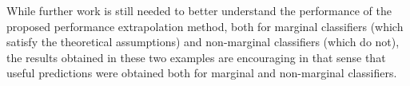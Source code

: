 \documentclass[12pt]{article}
\begin{document}
While further work is still needed to better understand the
performance of the proposed performance extrapolation method, both for
marginal classifiers (which satisfy the theoretical assumptions) and
non-marginal classifiers (which do not), the results obtained in these
two examples are encouraging in that sense that useful predictions
were obtained both for marginal and non-marginal classifiers.


\printbibliography[heading=bibintoc]
\end{document}
